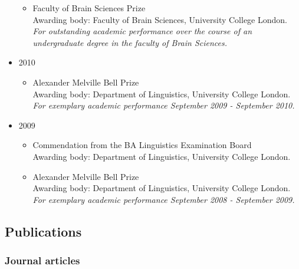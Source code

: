 \documentclass[]{article}
\providecommand{\tightlist}{%
  \setlength{\itemsep}{0pt}\setlength{\parskip}{0pt}}
\begin{document}
\begin{itemize}
  \begin{itemize}
  \tightlist
  \item
    Faculty of Brain Sciences Prize\\
    Awarding body: Faculty of Brain Sciences, University College
    London.\\
    \emph{For outstanding academic performance over the course of an
    undergraduate degree in the faculty of Brain Sciences.}
  \end{itemize}
\item
  2010

  \begin{itemize}
  \tightlist
  \item
    Alexander Melville Bell Prize\\
    Awarding body: Department of Linguistics, University College
    London.\\
    \emph{For exemplary academic performance September 2009 - September
    2010.}
  \end{itemize}
\item
  2009

  \begin{itemize}
  \tightlist
  \item
    Commendation from the BA Linguistics Examination Board\\
    Awarding body: Department of Linguistics, University College London.
  \item
    Alexander Melville Bell Prize\\
    Awarding body: Department of Linguistics, University College
    London.\\
    \emph{For exemplary academic performance September 2008 - September
    2009.}
  \end{itemize}
\end{itemize}

\subsection{Publications}\label{publications}

\subsubsection{Journal articles}\label{journal-articles}
\end{document}
